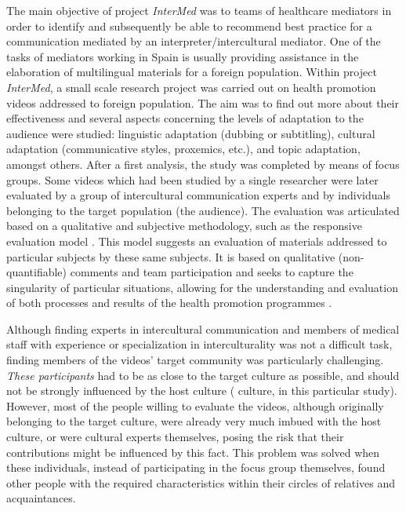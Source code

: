 \documentclass[output=paper]{LSP/langsci}
\begin{document}
The main objective of project \textit{InterMed} was to  teams of healthcare mediators in order to identify and subsequently be able to recommend best practice for a communication mediated by an interpreter\slash intercultural mediator. One of the tasks of mediators working in Spain is usually providing assistance in the elaboration of multilingual materials for a foreign population. Within project \textit{InterMed}, a small scale research project was carried out on health promotion videos addressed to foreign population. The aim was to find out more about their effectiveness and several aspects concerning the levels of adaptation to the audience were studied: linguistic adaptation (dubbing or subtitling), cultural adaptation (communicative styles, proxemics, etc.), and topic adaptation, amongst others. After a first analysis, the study was completed by means of focus groups. Some videos which had been studied by a single researcher were later evaluated by a group of intercultural communication experts and by individuals belonging to the target population (the audience). The evaluation was articulated based on a qualitative and subjective methodology, such as the responsive evaluation model \citep{Stake1976, Abma2005}. This model suggests an evaluation of materials addressed to particular subjects by these same subjects. It is based on qualitative (non-quantifiable) comments and team participation and seeks to capture the singularity of particular situations, allowing for the understanding and evaluation of both processes and results of the health promotion programmes \citep{Gamez2004}.

Although finding experts in intercultural communication and members of medical staff with experience or specialization in interculturality was not a difficult task, finding members of the videos' target community was particularly challenging. \textit{These participants} had to be as close to the target culture as possible, and should not be strongly influenced by the host culture ( culture, in this particular study). However, most of the people willing to evaluate the videos, although originally belonging to the target culture, were already very much imbued with the host culture, or were cultural experts themselves, posing the risk that their contributions might be influenced by this fact. This problem was solved when these individuals, instead of participating in the focus group themselves, found other people with the required characteristics within their circles of relatives and acquaintances. 
\end{document}
